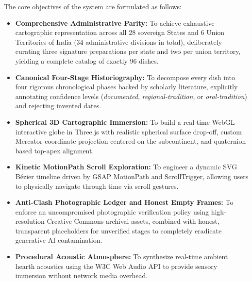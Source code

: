 \documentclass[11pt,a4paper]{report}
\begin{document}
The core objectives of the system are formulated as follows:
\begin{itemize}
    \item \textbf{Comprehensive Administrative Parity:} To achieve exhaustive cartographic representation across all 28 sovereign States and 6 Union Territories of India (34 administrative divisions in total), deliberately curating three signature preparations per state and two per union territory, yielding a complete catalog of exactly 96 dishes.
    \item \textbf{Canonical Four-Stage Historiography:} To decompose every dish into four rigorous chronological phases backed by scholarly literature, explicitly annotating confidence levels (\emph{documented}, \emph{regional-tradition}, or \emph{oral-tradition}) and rejecting invented dates.
    \item \textbf{Spherical 3D Cartographic Immersion:} To build a real-time WebGL interactive globe in Three.js with realistic spherical surface drop-off, custom Mercator coordinate projection centered on the subcontinent, and quaternion-based top-apex alignment.
    \item \textbf{Kinetic MotionPath Scroll Exploration:} To engineer a dynamic SVG Bézier timeline driven by GSAP MotionPath and ScrollTrigger, allowing users to physically navigate through time via scroll gestures.
    \item \textbf{Anti-Clash Photographic Ledger and Honest Empty Frames:} To enforce an uncompromised photographic verification policy using high-resolution Creative Commons archival assets, combined with honest, transparent placeholders for unverified stages to completely eradicate generative AI contamination.
    \item \textbf{Procedural Acoustic Atmosphere:} To synthesize real-time ambient hearth acoustics using the W3C Web Audio API to provide sensory immersion without network media overhead.
\end{itemize}
\end{document}
